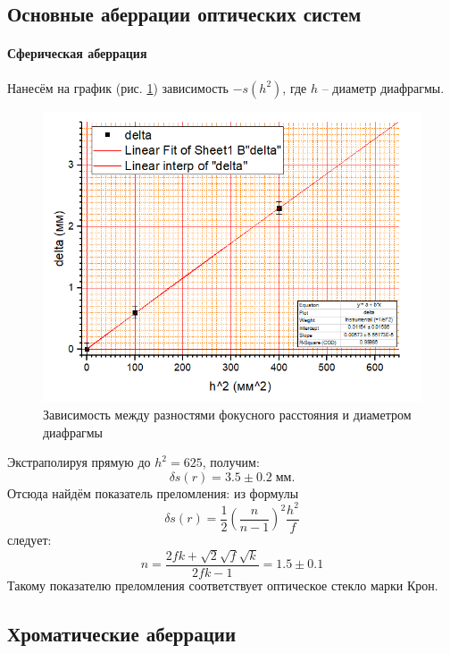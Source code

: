 \documentclass[a4paper]{article}
\newcommand{\picref}[1]{рис. \ref{#1}}
\begin{document}
\subsection{Основные аберрации оптических систем}

\paragraph{Сферическая аберрация}

Нанесём на график (\picref{6}) зависимость $ -s (h^2) $, где $ h $ -- диаметр диафрагмы.
\begin{figure}[tbp]
	\centering
	\includegraphics[width=0.8\linewidth]{Screenshot_7}
	\caption{Зависимость между разностями фокусного расстояния и диаметром диафрагмы}
	\label{6}
\end{figure}
Экстраполируя прямую до $ h^2 = 625 $, получим:
\begin{equation*}\label{key}
	\delta s (r) = 3.5\pm 0.2 \;мм.
\end{equation*}
Отсюда найдём показатель преломления: из формулы
\begin{equation}\label{key}
	\delta s (r) = \frac{1}{2} \left(\frac{n}{n-1}\right)^2 \frac{h^2}{f}
\end{equation}
следует:
\begin{equation}\label{key}
	n = \frac{2 f k+\sqrt{2} \sqrt{f} \sqrt{k}}{2 f k-1} = 1.5 \pm 0.1
\end{equation}
Такому показателю преломления соответствует оптическое стекло марки Крон.

\subsection{Хроматические аберрации}
\end{document}
